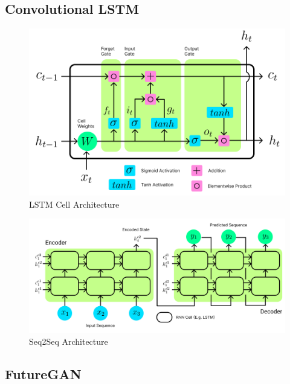 \documentclass{scrartcl}
\begin{document}
\subsection{Convolutional LSTM}
\label{subsec:conv_lstm}

\begin{figure}[H]
	\begin{center}
		\includegraphics[width=1\textwidth]{figures/lstmcell_arch.png}
	\end{center}
	\caption{LSTM Cell Architecture}
	\label{fig:lstmcell_arch}
\end{figure}

\begin{figure}[H]
	\begin{center}
		\includegraphics[width=1\textwidth]{figures/seq2seq_arch.png}
	\end{center}
	\caption{Seq2Seq Architecture}
	\label{fig:lstmcell_arch}
\end{figure}


\subsection{FutureGAN}
\label{subsec:futuregan}
\end{document}
